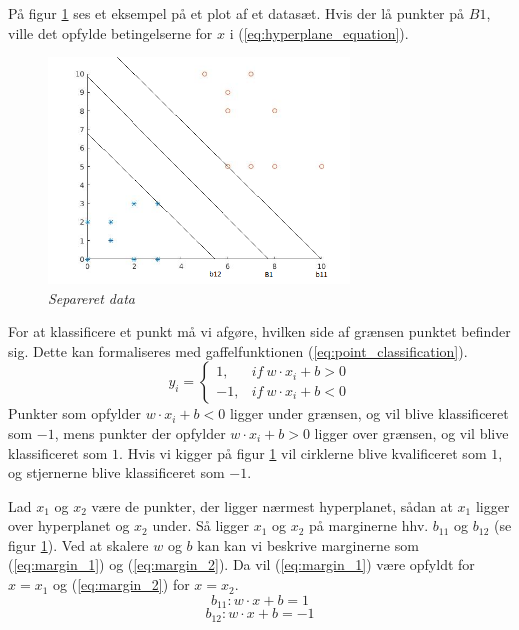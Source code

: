 \documentclass{article}
\begin{document}
På figur \ref{fig:hyperplane_example} ses et eksempel på et plot af et datasæt. Hvis der lå punkter på $B1$, ville det opfylde betingelserne for $x$ i (\ref{eq:hyperplane_equation}).
\begin{center}
\begin{figure}[H]
\includegraphics[width=8cm]{svm_plot}
\caption{\textit{Separeret data}}
\label{fig:hyperplane_example}
\end{figure}
\end{center}


For at klassificere et punkt må vi afgøre, hvilken side af grænsen punktet befinder sig. Dette kan formaliseres med gaffelfunktionen (\ref{eq:point_classification}). 
\begin{equation}
\label{eq:point_classification}
y_i = \left\{
\begin{array}{lr}
1, & if \ w \cdot x_i + b > 0 \\
-1, & if \ w \cdot x_i + b < 0
\end{array}
\right.
\end{equation}
Punkter som opfylder $w\cdot x_i + b <0$ ligger under grænsen, og vil blive klassificeret som $-1$, mens punkter der opfylder $w\cdot x_i +b >0$ ligger over grænsen, og vil blive klassificeret som $1$. Hvis vi kigger på figur \ref{fig:hyperplane_example} vil cirklerne blive kvalificeret som $1$, og stjernerne blive klassificeret som $-1$.

Lad $x_1$ og $x_2$ være de punkter, der ligger nærmest hyperplanet, sådan at $x_1$ ligger over hyperplanet og $x_2$ under. Så ligger $x_1$ og $x_2$ på marginerne hhv. $b_{11}$ og $b_{12}$ (se figur \ref{fig:hyperplane_example}). Ved at skalere $w$ og $b$ kan kan vi beskrive marginerne som (\ref{eq:margin_1}) og (\ref{eq:margin_2}). Da vil (\ref{eq:margin_1}) være opfyldt for $x=x_1$ og (\ref{eq:margin_2}) for $x=x_2$.
\begin{equation}
\label{eq:margin_1}
b_{11}: w\cdot x + b = 1
\end{equation}
\begin{equation}
\label{eq:margin_2}
b_{12}: w\cdot x + b = -1
\end{equation}
\end{document}
